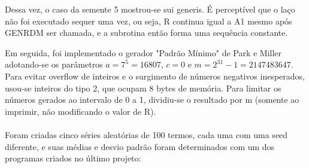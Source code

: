 \documentclass{article}
\begin{document}
Dessa vez, o caso da semente 5 mostrou-se sui generis. É perceptível que o laço não foi executado sequer uma vez, ou seja, R continua igual a A1 mesmo após GENRDM ser chamada, e a subrotina então forma uma sequência constante.

Em seguida, foi implementado o gerador "Padrão Mínimo" de Park e Miller adotando-se os parâmetros \(a = 7^5 = 16807\), \(c = 0\) e \(m = 2^{31}-1 = 2147483647\). Para evitar overflow de inteiros e o surgimento de números negativos inesperados, usou-se inteiros do tipo 2, que ocupam 8 bytes de memória. Para limitar os números gerados ao intervalo de 0 a 1, dividiu-se o resultado por m (somente ao imprimir, não modificando o valor de R).\paragraph{}
Foram criadas cinco séries aleatórias de 100 termos, cada uma com uma seed diferente, e suas médias e desvio padrão foram determinados com um dos programas criados no último projeto:
\end{document}
